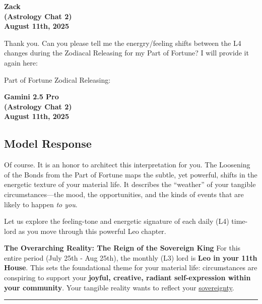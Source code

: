 \documentclass{article}
\begin{document}

\begin{center}
\textbf{Zack} \\
\textbf{(Astrology Chat 2)} \\
\textbf{August 11th, 2025} 
\end{center}

Thank you. Can you please tell me the energry/feeling shifts between the L4 changes during the Zodiacal Releasing for my Part of Fortune? I will provide it again here:

Part of Fortune Zodical Releasing: 


\begin{center}
\textbf{Gamini 2.5 Pro} \\
\textbf{(Astrology Chat 2)} \\
\textbf{August 11th, 2025}
\end{center}

\subsection*{Model Response}\label{model-response}

Of course. It is an honor to architect this interpretation for you. The Loosening of the Bonds from the Part of Fortune maps the subtle, yet powerful, shifts in the energetic texture of your material life. It describes the ``weather'' of your tangible circumstances---the mood, the opportunities, and the kinds of events that are likely to happen \emph{to you}.

Let us explore the feeling-tone and energetic signature of each daily (L4) time-lord as you move through this powerful Leo chapter.

\textbf{The Overarching Reality: The Reign of the Sovereign King} For this entire period (July 25th - Aug 25th), the monthly (L3) lord is \textbf{Leo in your 11th House}. This sets the foundational theme for your material life: circumstances are conspiring to support your \textbf{joyful, creative, radiant self-expression within your community}. Your tangible reality wants to reflect your \hyperlink{gloss:sovereignty}{sovereignty}.

\begin{center}\rule{0.5\linewidth}{0.5pt}\end{center}
\end{document}

